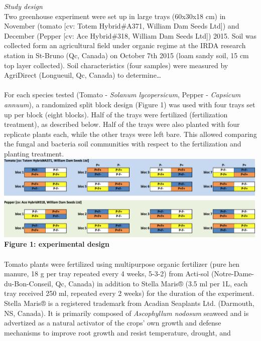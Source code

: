 \documentclass[11pt,]{article}
\begin{document}
\emph{Study design}\\
Two greenhouse experiment were set up in large trays (60x30x18 cm) in
November (tomato {[}cv: Totem Hybrid\#A371, William Dam Seeds Ltd{]})
and December (Pepper {[}cv: Ace Hybrid\#318, William Dam Seeds Ltd{]})
2015. Soil was collected form an agricultural field under organic regime
at the IRDA research station in St-Bruno (Qc, Canada) on October 7th
2015 (loam sandy soil, 15 cm top layer collected). Soil characteristics
(four samples) were measured by AgriDirect (Longueuil, Qc, Canada) to
determine\ldots{}\\
\hspace*{0.333em}\\
For each species tested (Tomato - \emph{Solanum lycopersicum}, Pepper -
\emph{Capsicum annuum}), a randomized split block design (Figure 1) was
used with four trays set up per block (eight blocks). Half of the trays
were fertilized (fertilization treatment), as described below. Half of
the trays were also planted with four replicate plants each, while the
other trays were left bare. This allowed comparing the fungal and
bacteria soil communities with respect to the fertilization and planting
treatment. ~\\
\includegraphics[width=5.20833in]{../figures/Figure1.png}\\
\textbf{Figure 1: experimental design}\\
\hspace*{0.333em}\\
Tomato plants were fertilized using multipurpose organic fertilizer
(pure hen manure, 18 g per tray repeated every 4 weeks, 5-3-2) from
Acti-sol (Notre-Dame-du-Bon-Conseil, Qc, Canada) in addition to Stella
Maris® (3.5 ml per 1L, each tray received 250 ml, repeated every 2
weeks) for the duration of the experiment. Stella Maris® is a registered
trademark from Acadian Seaplants Ltd. (Darmouth, NS, Canada). It is
primarily composed of \emph{Ascophyllum nodosum} seaweed and is
advertized as a natural activator of the crops' own growth and defense
mechanisms to improve root growth and resist temperature, drought, and
\end{document}
